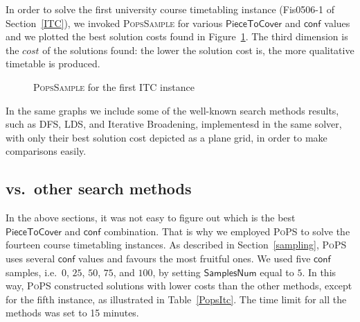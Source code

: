\documentclass{ws-ijait}
\begin{document}
In order to solve the first university course timetabling instance (\textsf{Fis0506-1} of Section~\ref{ITC}), we invoked \textsc{PopsSample} for various $\mathsf{PieceToCover}$ and $\mathsf{conf}$ values and we plotted the best solution costs found in Figure~\ref{ITC1}. The third dimension is the $cost$ of the solutions found: the lower the solution cost is, the more qualitative timetable is produced.

\begin{figure}
  \centering
  
  \caption{{\normalfont\textsc{PopsSample}} for the first ITC instance\label{ITC1}}
\end{figure}

In the same graphs we include some of the well-known search methods results, such as DFS, LDS, and Iterative Broadening, implementesd in the same solver, with only their best solution cost depicted as a plane grid, in order to make comparisons easily.


\subsection{\PoPS{} vs.\ other search methods}

In the above sections, it was not easy to figure out which is the best $\mathsf{PieceToCover}$ and $\mathsf{conf}$ combination. That is why we employed \textsc{PoPS} to solve the fourteen course timetabling instances. As described in Section~\ref{sampling}, \textsc{PoPS} uses several $\mathsf{conf}$ values and favours the most fruitful ones. We used five $\mathsf{conf}$ samples, i.e.\ $0$, $25$, $50$, $75$, and $100$, by setting $\mathsf{SamplesNum}$ equal to $5$. In this way, \textsc{PoPS} constructed solutions with lower costs than the other methods, except for the fifth instance, as illustrated in Table~\ref{PopsItc}. The time limit for all the methods was set to 15 minutes.
\end{document}

